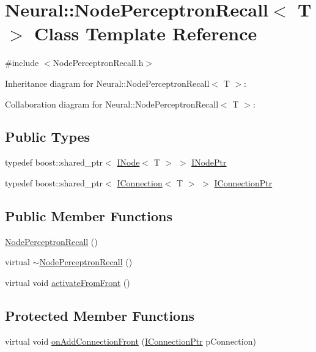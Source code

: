 \hypertarget{class_neural_1_1_node_perceptron_recall}{
\section{Neural::NodePerceptronRecall$<$ T $>$ Class Template Reference}
\label{class_neural_1_1_node_perceptron_recall}
}


{\ttfamily \#include $<$NodePerceptronRecall.h$>$}



Inheritance diagram for Neural::NodePerceptronRecall$<$ T $>$:


Collaboration diagram for Neural::NodePerceptronRecall$<$ T $>$:
\subsection*{Public Types}
\begin{DoxyCompactItemize}
\item 
typedef boost::shared\_\-ptr$<$ \hyperlink{class_neural_1_1_i_node}{INode}$<$ T $>$ $>$ \hyperlink{class_neural_1_1_node_perceptron_recall_a4c6a00d31ba7b35faf51ead0dcc99e43}{INodePtr}
\item 
typedef boost::shared\_\-ptr$<$ \hyperlink{class_neural_1_1_i_connection}{IConnection}$<$ T $>$ $>$ \hyperlink{class_neural_1_1_node_perceptron_recall_a3810ccef790454bbb05dcb86a1743d30}{IConnectionPtr}
\end{DoxyCompactItemize}
\subsection*{Public Member Functions}
\begin{DoxyCompactItemize}
\item 
\hyperlink{class_neural_1_1_node_perceptron_recall_aa09bc6f250ae45698aedf9f71f8fd2e5}{NodePerceptronRecall} ()
\item 
virtual \hyperlink{class_neural_1_1_node_perceptron_recall_a90e9fc4970353b66de3b79a163e51f68}{$\sim$NodePerceptronRecall} ()
\item 
virtual void \hyperlink{class_neural_1_1_node_perceptron_recall_aba78057a00733c9256e70e92ed6c8cec}{activateFromFront} ()
\end{DoxyCompactItemize}
\subsection*{Protected Member Functions}
\begin{DoxyCompactItemize}
\item 
virtual void \hyperlink{class_neural_1_1_node_perceptron_recall_a5453f4f964b8e9b3883a734edc86266e}{onAddConnectionFront} (\hyperlink{class_neural_1_1_i_node_a5243be0a422bcddc5a71a79920d09fd1}{IConnectionPtr} pConnection)
\end{DoxyCompactItemize}

